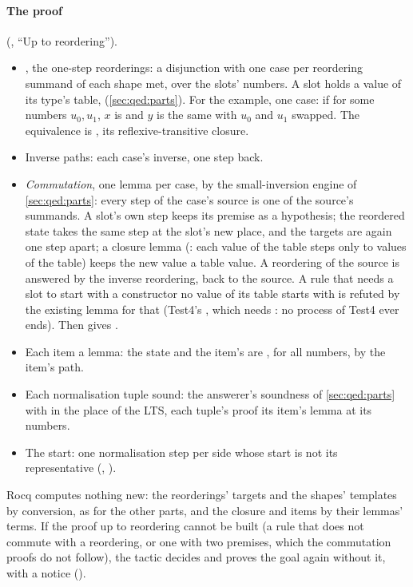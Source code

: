 \paragraph{The proof} (, ``Up to reordering'').
\begin{itemize}
\item {}, the one-step reorderings: a disjunction with one case
  per reordering summand of each shape met, over the slots' numbers. A
  slot holds a value of its type's table, 
  (\cref{sec:qed:parts}). For the example, one case:  if
  for some numbers $u_0, u_1$, $x$ is  and $y$ is the same with $u_0$ and $u_1$ swapped. The
  equivalence is , its reflexive-transitive closure.
\item Inverse paths: each case's inverse, one step back.
\item \emph{Commutation}, one lemma per case, by the small-inversion
  engine of \cref{sec:qed:parts}: every step of the case's source is one
  of the source's summands. A slot's own step keeps its premise as a
  hypothesis; the reordered state takes the same step at the slot's new
  place, and the targets are again one  step apart; a closure
  lemma (: each value of the table steps only to values of the
  table) keeps the new value a table value. A reordering of the source is
  answered by the inverse reordering, back to the source. A rule that
  needs a slot to start with a constructor no value of its table starts
  with is refuted by the existing lemma for that (Test4's
  , which needs : no process of Test4 ever
  ends). Then  gives .
\item Each item a lemma: the state and the item's are ,
  for all numbers, by the item's path.
\item Each normalisation tuple sound: the answerer's soundness of
  \cref{sec:qed:parts} with  in the place
  of the LTS, each tuple's proof its item's lemma at its numbers.
\item The start: one normalisation step per side whose start is not its
  representative (, ).
\end{itemize}
Rocq computes nothing new: the reorderings' targets and the shapes'
templates by conversion, as for the other parts, and the closure and
items by their lemmas' terms. If the proof up to reordering cannot be
built (a rule that does not commute with a reordering, or one with two
premises, which the commutation proofs do not follow), the tactic
decides and proves the goal again without it, with a notice
().


